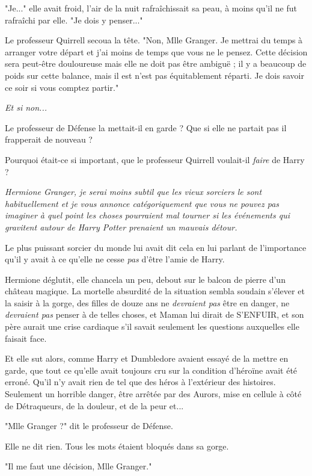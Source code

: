"Je..." elle avait froid, l'air de la nuit rafraîchissait sa peau, à moins qu'il ne fut rafraîchi par elle. "Je dois y penser..."

Le professeur Quirrell secoua la tête. "Non, Mlle Granger. Je mettrai du temps à arranger votre départ et j'ai moins de temps que vous ne le pensez. Cette décision sera peut-être douloureuse mais elle ne doit pas être ambiguë ; il y a beaucoup de poids sur cette balance, mais il est n'est pas équitablement réparti. Je dois savoir ce soir si vous comptez partir."

\emph{Et si non...} 

Le professeur de Défense la mettait-il en garde ? Que si elle ne partait pas il frapperait de nouveau ?

Pourquoi était-ce si important, que le professeur Quirrell voulait-il \emph{faire}  de Harry ?

\emph{Hermione Granger, je serai moins subtil que les vieux sorciers le sont habituellement et je vous annonce catégoriquement que vous ne pouvez pas imaginer à quel point les choses pourraient mal tourner si les événements qui gravitent autour de Harry Potter prenaient un mauvais détour.} 

Le plus puissant sorcier du monde lui avait dit cela en lui parlant de l'importance qu'il y avait à ce qu'elle ne cesse \emph{pas}  d'être l'amie de Harry.

Hermione déglutit, elle chancela un peu, debout sur le balcon de pierre d'un château magique. La mortelle absurdité de la situation sembla soudain s'élever et la saisir à la gorge, des filles de douze ans ne \emph{devraient pas}  être en danger, ne \emph{devraient pas}  penser à de telles choses, et Maman lui dirait de S'ENFUIR, et son père aurait une crise cardiaque s'il savait seulement les questions auxquelles elle faisait face.

Et elle sut alors, comme Harry et Dumbledore avaient essayé de la mettre en garde, que tout ce qu'elle avait toujours cru sur la condition d'héroïne avait été erroné. Qu'il n'y avait rien de tel que des héros à l'extérieur des histoires. Seulement un horrible danger, être arrêtée par des Aurors, mise en cellule à côté de Détraqueurs, de la douleur, et de la peur et...

"Mlle Granger ?" dit le professeur de Défense.

Elle ne dit rien. Tous les mots étaient bloqués dans sa gorge.

"Il me faut une décision, Mlle Granger."

